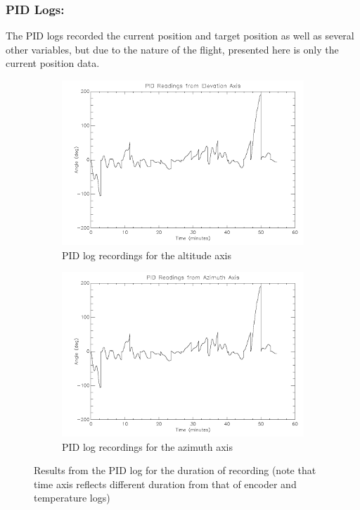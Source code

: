 {\subsubsection*{PID Logs:}

The PID logs recorded the current position and target position as well as several other variables, but due to the nature of the flight, presented here is only the current position data. 

\begin{figure}[htbp]
\captionsetup[subfigure]{justification=centering}
\captionsetup{justification=centering}
    \centering
	\begin{subfigure}{0.45\textwidth}
		\includegraphics[width=1\linewidth]{appendix/img/campaign_results/pid_alt.png}
		\caption{PID log recordings for the altitude axis}
		\label{fig:sub:pidalt}
	\end{subfigure}
	\begin{subfigure}{0.45\textwidth}
		\includegraphics[width=1\linewidth]{appendix/img/campaign_results/pid_az.png}
		\caption{PID log recordings for the azimuth axis}
		\label{fig:sub:pidaz}
	\end{subfigure}
	\caption{Results from the PID log for the duration of recording (note that time axis reflects different duration from that of encoder and temperature logs)}
	\label{fig:PID}
\end{figure}

}
